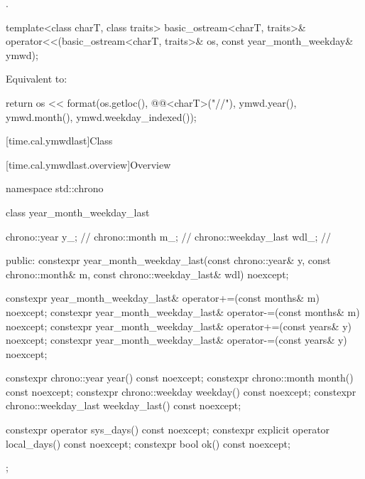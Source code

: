 \begin{itemdescr}
\pnum
\returns
{}.
\end{itemdescr}

%
\begin{itemdecl}
template<class charT, class traits>
  basic_ostream<charT, traits>&
    operator<<(basic_ostream<charT, traits>& os, const year_month_weekday& ymwd);
\end{itemdecl}

\begin{itemdescr}
\pnum
\effects
Equivalent to:
\begin{codeblock}
return os << format(os.getloc(), @@<charT>("{}/{}/{}"),
                    ymwd.year(), ymwd.month(), ymwd.weekday_indexed());
\end{codeblock}
\end{itemdescr}

[time.cal.ymwdlast]{Class }

[time.cal.ymwdlast.overview]{Overview}

\begin{codeblock}
namespace std::chrono {
  class year_month_weekday_last {
    chrono::year         y_;    // \expos
    chrono::month        m_;    // \expos
    chrono::weekday_last wdl_;  // \expos

  public:
    constexpr year_month_weekday_last(const chrono::year& y, const chrono::month& m,
                                      const chrono::weekday_last& wdl) noexcept;

    constexpr year_month_weekday_last& operator+=(const months& m) noexcept;
    constexpr year_month_weekday_last& operator-=(const months& m) noexcept;
    constexpr year_month_weekday_last& operator+=(const years& y)  noexcept;
    constexpr year_month_weekday_last& operator-=(const years& y)  noexcept;

    constexpr chrono::year         year()         const noexcept;
    constexpr chrono::month        month()        const noexcept;
    constexpr chrono::weekday      weekday()      const noexcept;
    constexpr chrono::weekday_last weekday_last() const noexcept;

    constexpr          operator sys_days()   const noexcept;
    constexpr explicit operator local_days() const noexcept;
    constexpr bool ok() const noexcept;
  };
}
\end{codeblock}

